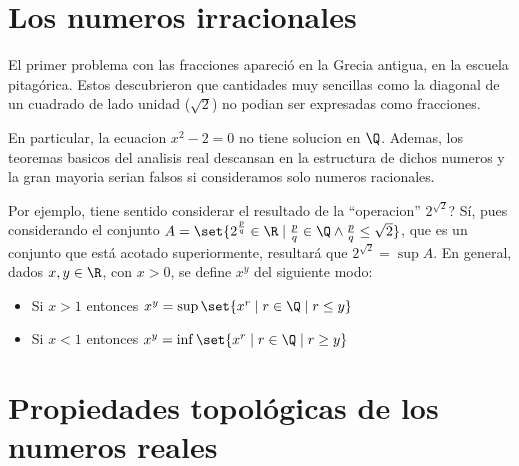 \section{Los numeros irracionales}
El primer problema con las fracciones apareció en la Grecia antigua, en la escuela pitagórica. Estos descubrieron que cantidades muy sencillas como la diagonal de un cuadrado de lado unidad (\(\sqrt{2 } \)) no podian ser expresadas como fracciones.

En particular, la ecuacion \(x^{2 } - 2= 0 \) no tiene solucion en \(\Q \). Ademas, los teoremas basicos del analisis real descansan en la estructura de dichos numeros y la gran mayoria serian falsos si consideramos solo numeros racionales.

Por ejemplo, tiene sentido considerar el resultado de la ``operacion'' \(2^{\sqrt{2} } \)? Sí, pues considerando el conjunto \(A = \set{2^{\frac{p}{q}} \in \R \mid \frac{p}{q } \in \Q \wedge \frac{p}{q } \leq \sqrt{2} }\), que es un conjunto que está acotado superiormente, resultará que \(2^{\sqrt{2 } } = \sup A \). En general, dados \(x,y \in \R \), con \(x > 0 \), se define \(x^{y } \) del siguiente modo:
\begin{itemize}
	\item Si \(x > 1 \) entonces \(x^{y } = \sup \set{x^{r } \mid r \in \Q \mid r \leq y}\)
	\item Si \(x < 1 \) entonces \(x^{y } = \inf \set{x^{r} \mid r \in \Q \mid r \geq y}\)
\end{itemize}
\section{Propiedades topológicas de los numeros reales}
